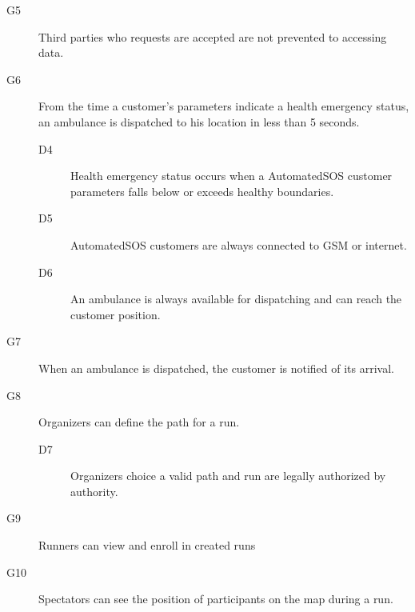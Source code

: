 \documentclass[../main.tex]{subfiles}
\begin{document}
\begin{description}
\begin{description}
        \end{description}
    \item [G5]  Third parties who requests are accepted are not prevented to accessing data.
        \begin{description}
            \item

        \end{description}
    \item [G6]  From the time a customer's parameters indicate a health emergency status, an ambulance is dispatched to his location in less than 5 seconds.
        \begin{description}
            \item [D4] Health emergency status occurs when a AutomatedSOS customer parameters falls below or exceeds healthy boundaries.
            \item [D5] AutomatedSOS customers are always connected to GSM or internet.
            \item [D6] An ambulance is always available for dispatching and can reach the customer position.
            
        \end{description}
    \item [G7]  When an ambulance is dispatched, the customer is notified of its arrival.
        \begin{description}
            \item 

        \end{description}

    \item [G8]  Organizers can define the path for a run.
        \begin{description}
            \item [D7] Organizers choice a valid path and run are legally authorized by authority.

        \end{description}

    \item [G9]  Runners can view and enroll in created runs
        \begin{description}
            \item []

        \end{description}

    \item [G10] Spectators can see the position of participants on the map during a run.
        \begin{description}
            \item

        \end{description}
\end{description}
\end{document}
